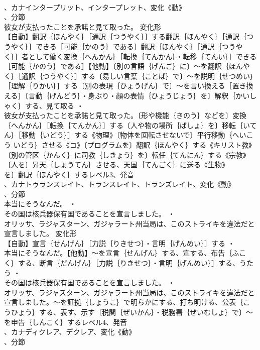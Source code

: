 \documentclass[8pt]{extreport}
\begin{document}
\begin{CJK}{UTF8}{min}
\\	、カナインタープリット、インタープレット、変化《動》
\\	、分節
\\	彼女が支払ったことを承諾と見て取った。	変化形 
\\	【自動】翻訳｛ほんやく｝［通訳｛つうやく｝］する翻訳｛ほんやく｝［通訳｛つうやく｝］できる［可能｛かのう｝である］翻訳｛ほんやく｝［通訳｛つうやく｝］者として働く変換｛へんかん｝［転換｛てんかん｝・転移｛てんい｝］できる［可能｛かのう｝である］【他動】〔別の言語｛げんご｝に〕～を翻訳｛ほんやく｝［通訳｛つうやく｝］する〔易しい言葉｛ことば｝で〕～を説明｛せつめい｝［理解｛りかい｝］する〔別の表現｛ひょうげん｝で〕～を言い換える［置き換える］〔言動｛げんどう｝・身ぶり・顔の表情｛ひょうじょう｝を〕解釈｛かいしゃく｝する、見て取る ・
\\	彼女が支払ったことを承諾と見て取った。〔形や機能｛きのう｝などを〕変換｛へんかん｝［転換｛てんかん｝］する〔人や物の場所｛ばしょ｝を〕移転｛いてん｝［移動｛いどう｝］する《物理》〔物体を回転させないで〕平行移動｛へいこう いどう｝させる《コ》〔プログラムを〕翻訳｛ほんやく｝する《キリスト教》〔別の管区｛かんく｝に司教｛しきょう｝を〕転任｛てんにん｝する《宗教》〔人を〕昇天｛しょうてん｝させる、天国｛てんごく｝に送る《生物》
\\	を〕翻訳｛ほんやく｝するレベル3、発音
\\	、カナトゥランスレイト、トランスレイト、トランズレイト、変化《動》
\\	、分節
\\	本当にそうなんだ。 ・
\\	その国は核兵器保有国であることを宣言しました。 ・
\\	オリッサ、ラジャスターン、ガジャラート州当局は、このストライキを違法だと宣言しました。	変化形 
\\	【自動】宣言｛せんげん｝［力説｛りきせつ｝・言明｛げんめい｝］する ・
\\	本当にそうなんだ。【他動】～を宣言｛せんげん｝する、宣する、布告｛ふこく｝する、断言｛だんげん｝［力説｛りきせつ｝・言明｛げんめい｝］する、うたう ・
\\	その国は核兵器保有国であることを宣言しました。 ・
\\	オリッサ、ラジャスターン、ガジャラート州当局は、このストライキを違法だと宣言しました。～を証拠｛しょうこ｝で明らかにする、打ち明ける、公表｛こうひょう｝する、表す、示す〔税関｛ぜいかん｝・税務署｛ぜいむしょ｝で〕～を申告｛しんこく｝するレベル4、発音
\\	、カナディクレア、デクレア、変化《動》
\\	、分節

\end{CJK}
\end{document}
